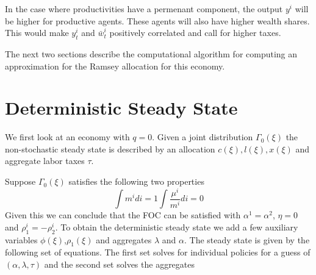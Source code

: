 \documentclass[thmsb,11pt]{article}
\begin{document}
In the case where productivities have a permenant component, the output $y^i$ will be higher for productive agents. These agents will also have higher wealth shares. This would make $y^i_t$ and $\bar{w}^i_t$ positively correlated and call for higher taxes. 

The next two sections describe the computational algorithm for computing an approximation for the Ramsey allocation for this economy.

\section{Deterministic Steady State}
We first look at an economy with $q=0$. Given a joint distribution $\Gamma_0(\xi)$ the non-stochastic steady state is described by an allocation $c(\xi), l(\xi), x(\xi)$ and aggregate labor taxes $\tau$. 

Suppose $\Gamma_0(\xi)$ satisfies the following two properties
   \begin{subequations}
   \label{sys-gamma_0_prop}
	\begin{equation}
	\int m^i di=1
	\end{equation}
	\begin{equation}
	\int \frac{\mu^i}{m^i} di=0
	\end{equation}
   \end{subequations}
Given this we can conclude that the FOC can be satisfied with $\alpha^1=\alpha^2$, $\eta=0$ and $\rho^i_{1}=-\rho^i_2$. To obtain the deterministic steady state we add a few auxiliary variables $\phi(\xi)$,$\rho_1(\xi)$ and aggregates $\lambda$ and $\alpha$. The steady state is given by the following set of equations.  The first set solves for individual policies for a guess of $(\alpha,\lambda,\tau)$ and the second set solves the aggregates
\end{document}

